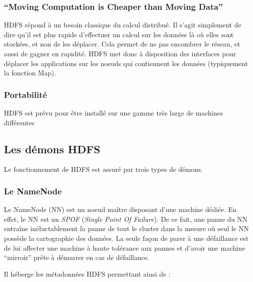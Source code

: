 \subsubsection{``Moving Computation is Cheaper than Moving Data''}
\label{sec:moving-comp-cheap}

\par HDFS répond à un besoin classique du calcul distribué. Il s'agit simplement de dire qu'il est plus rapide d'effectuer un calcul sur les données là où elles sont stockées, et non de les déplacer. Cela permet de ne pas encombrer le réseau, et aussi de gagner en rapidité. HDFS met donc à disposition des interfaces pour déplacer les applications sur les noeuds qui contiennent les données (typiquement la fonction Map).

\subsubsection{Portabilité}
\label{sec:portabilite}

\par HDFS est prévu pour être installé sur une gamme très large de machines différentes

\subsection{Les démons HDFS}
\label{sec:demons_hdfs}

\par Le fonctionnement de HDFS est assuré par trois types de démons.

\subsubsection{Le NameNode}
\label{sec:namenode}

\par Le NameNode (NN) est un noeud maître disposant d'une machine dédiée. En effet, le NN est un \textit{SPOF} (\textit{Single Point Of Failure}). De ce fait, une panne du NN entraîne inéluctablement la panne de tout le cluster dans la mesure où seul le NN possède la cartographie des données. La seule façon de parer à une défaillance est de lui affecter une machine à haute tolérance aux pannes et d'avoir une machine \textquotedblleft{}mirroir\textquotedblright{} prête à démarrer en cas de défaillance.

\par Il héberge les métadonnées HDFS permettant ainsi de :

